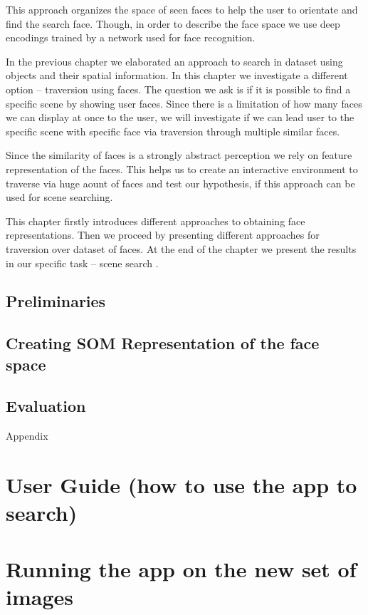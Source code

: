 This approach organizes the space of seen faces to help the user to orientate and find the search face. Though, in order to describe the face space we use deep encodings trained by a network used for face recognition.

In the previous chapter we elaborated an approach to search in dataset using objects and their spatial information. In this chapter we investigate a different option -- traversion using faces. The question we ask is if it is possible to find a specific scene by showing user faces. Since there is a limitation of how many faces we can display at once to the user, we will investigate if we can lead user to the specific scene with specific face via traversion through multiple similar faces.

Since the similarity of faces is a strongly abstract perception we rely on feature representation of the faces. This helps us to create an interactive environment to traverse via huge aount of faces and test our hypothesis, if this approach can be used for scene searching. 

This chapter firstly introduces different approaches to obtaining face representations. Then we proceed by presenting different approaches for traversion over dataset of faces. At the end of the chapter we present the results in our specific task -- scene search .

\section{Preliminaries}
\section{Creating SOM Representation of the face space}
\section{Evaluation}

Appendix
\chapter{User Guide (how to use the app to search)}
\chapter{ Running the app on the new set of images}
